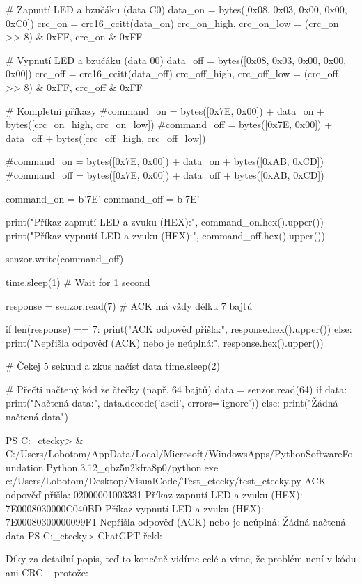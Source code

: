 # Zapnutí LED a bzučáku (data C0)
data_on = bytes([0x08, 0x03, 0x00, 0x00, 0xC0])
crc_on = crc16_ccitt(data_on)
crc_on_high, crc_on_low = (crc_on >> 8) & 0xFF, crc_on & 0xFF

# Vypnutí LED a bzučáku (data 00)
data_off = bytes([0x08, 0x03, 0x00, 0x00, 0x00])
crc_off = crc16_ccitt(data_off)
crc_off_high, crc_off_low = (crc_off >> 8) & 0xFF, crc_off & 0xFF

# Kompletní příkazy
#command_on = bytes([0x7E, 0x00]) + data_on + bytes([crc_on_high, crc_on_low])
#command_off = bytes([0x7E, 0x00]) + data_off + bytes([crc_off_high, crc_off_low])

#command_on = bytes([0x7E, 0x00]) + data_on + bytes([0xAB, 0xCD])
#command_off = bytes([0x7E, 0x00]) + data_off + bytes([0xAB, 0xCD])

command_on = b'\x7E\xBD'
command_off = b'\x7E'

print("Příkaz zapnutí LED a zvuku (HEX):", command_on.hex().upper())
print("Příkaz vypnutí LED a zvuku (HEX):", command_off.hex().upper())

senzor.write(command_off)

time.sleep(1)  # Wait for 1 second

response = senzor.read(7)  # ACK má vždy délku 7 bajtů

if len(response) == 7:
    print("ACK odpověď přišla:", response.hex().upper())
else:
    print("Nepřišla odpověď (ACK) nebo je neúplná:", response.hex().upper())



# Čekej 5 sekund a zkus načíst data
time.sleep(2)

# Přečti načtený kód ze čtečky (např. 64 bajtů)
data = senzor.read(64)
if data:
    print("Načtená data:", data.decode('ascii', errors='ignore'))
else:
    print("Žádná načtená data")


PS C:\Users\Lobotom\Desktop\VisualCode\Test_ctecky> & C:/Users/Lobotom/AppData/Local/Microsoft/WindowsApps/PythonSoftwareFoundation.Python.3.12_qbz5n2kfra8p0/python.exe c:/Users/Lobotom/Desktop/VisualCode/Test_ctecky/test_ctecky.py
ACK odpověď přišla: 02000001003331
Příkaz zapnutí LED a zvuku (HEX): 7E0008030000C040BD
Příkaz vypnutí LED a zvuku (HEX): 7E00080300000099F1
Nepřišla odpověď (ACK) nebo je neúplná: 
Žádná načtená data
PS C:\Users\Lobotom\Desktop\VisualCode\Test_ctecky> 
ChatGPT řekl:

Díky za detailní popis, teď to konečně vidíme celé a víme, že problém není v kódu ani CRC – protože:

